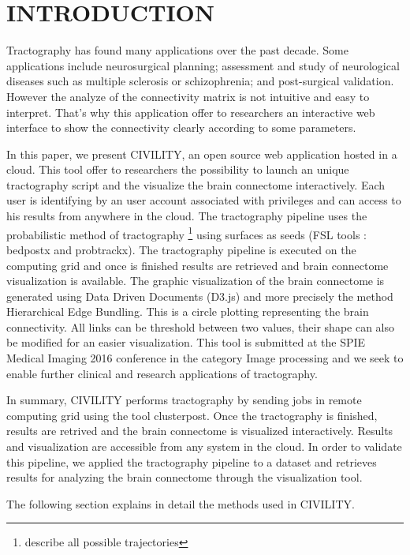 \documentclass[]{spie}  %
\begin{document}
\section{INTRODUCTION}
\label{sec:intro}

Tractography has found many applications over the past decade. Some applications include neurosurgical planning; assessment and study of neurological diseases such as multiple sclerosis  or schizophrenia; and post-surgical validation. However the analyze of the connectivity matrix is not intuitive and easy to interpret. That's why this application offer to researchers an interactive web interface to show the connectivity clearly according to some parameters. 

In this paper, we present CIVILITY, an open source web application hosted in a cloud. This tool offer to researchers the possibility to launch an unique tractography script and the visualize the brain connectome interactively. Each user is identifying by an user account associated with privileges and can access to his results from anywhere in the cloud.
The tractography pipeline uses the probabilistic method  of tractography \footnote{describe all possible trajectories} using surfaces as seeds (FSL tools : bedpostx and probtrackx). The tractography pipeline is executed on the computing grid and once is finished results are retrieved and brain connectome visualization is available. 
The graphic visualization of the brain connectome is generated using Data Driven Documents (D3.js) and more precisely the method Hierarchical Edge Bundling. This is a circle plotting representing the brain connectivity. All links can be threshold between two values, their shape can also be modified for an easier visualization. This tool is submitted at the SPIE Medical Imaging 2016 conference in the category Image processing and we seek to enable further clinical and research applications of tractography.

In summary, CIVILITY performs tractography by sending jobs in remote computing grid using the tool clusterpost. Once the tractography is finished, results are retrived and the brain connectome is visualized interactively. Results and visualization are accessible from any system in the cloud.
In order to validate this pipeline, we applied the tractography pipeline to a dataset and retrieves results for analyzing the brain connectome through the visualization tool.

The following section explains in detail the methods used in CIVILITY.
\end{document}
